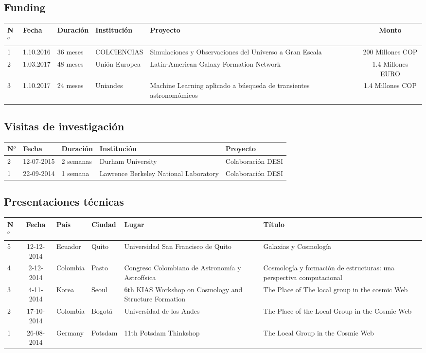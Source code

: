 \documentclass{article}
\begin{document}
\subsection{Funding}
\begin{tabular}{l l l p{2.4cm} p{4.0cm} c}\hline
N$^{o}$ & Fecha & Duraci\'on & Instituci\'on & Proyecto & Monto \\\hline
1 & 1.10.2016 & 36 meses & COLCIENCIAS & Simulaciones y Observaciones del Universo a Gran Escala & 200 Millones COP\\\hline
2 & 1.03.2017 & 48 meses & Uni\'on Europea & Latin-American Galaxy Formation Network & 1.4 Millones EURO \\\hline
3 & 1.10.2017 & 24 meses & Uniandes & Machine Learning aplicado a b\'usqueda de transientes astronom\'omicos& 1.4 Millones COP \\
\\\hline 
\end{tabular}

\subsection{Visitas de investigaci\'on}

\begin{tabular}{l l l p{3.5cm} p{5.0cm}}\hline
N$^{o}$ & Fecha & Duraci\'on & Instituci\'on & Proyecto \\\hline
2 & 12-07-2015 & 2 semanas & Durham University & Colaboraci\'on DESI\\
1 & 22-09-2014 & 1 semana & Lawrence Berkeley National
Laboratory & Colaboraci\'on DESI\\\hline
\end{tabular}

\subsection{Presentaciones t\'ecnicas}

\begin{tabular}{l c l l p{2cm} p{5cm}}\hline
N$^{o}$ & Fecha & Pa\'is & Ciudad & Lugar & T\'itulo \\\hline
5 & 12-12-2014 & Ecuador & Quito & Universidad San Francisco de Quito & Galaxias y Cosmolog\'ia\\
4 & 2-12-2014 & Colombia & Pasto & Congreso Colombiano de Astronom\'ia y Astrof\'isica & Cosmolog\'ia y formaci\'on de estructuras: una perspectiva computacional\\
3 & 4-11-2014 & Korea & Seoul & 6th KIAS Workshop on Cosmology and Structure Formation & The Place of The local group in the cosmic Web\\
2 & 17-10-2014 & Colombia & Bogot\'a & Universidad de los Andes & The
Place of the Local Group in the Cosmic Web\\
1 & 26-08-2014 & Germany & Potsdam & 11th Potsdam Thinkshop & The Local
Group in the Cosmic Web\\ \hline
\end{tabular}
\end{document}

